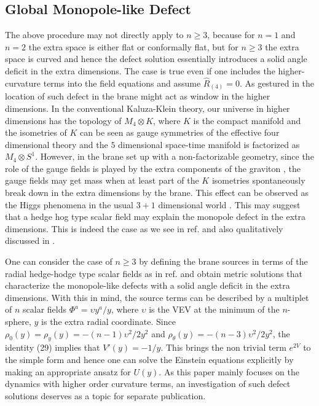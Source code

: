 \documentclass[a4paper,12pt]{article}
\begin{document}
\subsection{Global Monopole-like Defect}
The above procedure may not directly apply to $n\geq 3$, because for $n=1$ 
and $n=2$ the extra space is either flat or conformally flat, but for $n\geq 
3$ the extra space is curved and hence the defect solution essentially 
introduces a solid angle deficit in the extra dimensions. The case is true 
even if one includes the higher-curvature terms 
into the field equations and assume $\hat{R}_{(4)}=0$. As gestured in 
\cite{DVA} the location of such defect in the brane might act as window 
in the higher dimensions. In the conventional Kaluza-Klein theory, our 
universe in higher dimensions has the topology of $M_4\otimes K$, where $K$ 
is the compact manifold and the isometries of $K$ can be seen as gauge 
symmetries of the effective four dimensional theory \cite{YMC} and
the $5$ dimensional space-time manifold is factorized as $M_4\otimes S^1$.
However, in the brane set up with a non-factorizable geometry, since the role 
of the gauge fields is played by the extra components of the graviton 
\cite{NAH}, the gauge fields may get mass when at least part of 
the $K$ isometries spontaneously break down in the extra dimensions by 
the brane. This effect can be observed as the Higgs phenomena 
in the usual $3+1$ dimensional world \cite{DVA}. This may suggest that a 
hedge hog type scalar field may explain the monopole defect in 
the extra dimensions. This is indeed the case as we see in ref.\cite{IAV} 
and also qualitatively discussed in \cite{DVA}.

One can consider the case of $n\geq3$ by defining the brane 
sources in terms of the radial hedge-hodge type scalar fields as in 
ref.\cite{IAV} and obtain metric solutions that characterize the monopole-like 
defects with a solid angle deficit in the extra dimensions. 
With this in mind, the source terms can be described by a multiplet of 
$n$ scalar fields $\Phi^a=\upsilon y^a/y$, 
where $\upsilon$ is the VEV at the minimum of the $n$-sphere, $y$ is the 
extra radial coordinate. Since $\rho_0(y)=\rho_y(y)=-(n-1)\upsilon^2/{2y^2}$ 
and $\rho_{\theta}(y)=-(n-3)\upsilon^2/{2y^2}$, the identity (29) 
implies that $V'(y)= -1/y$. This brings the non trivial term $e^{2V}$ to the 
simple form and hence one can solve the Einstein equations explicitly by 
making an appropriate ansatz for $U(y)$. As this paper mainly focuses on 
the dynamics with higher order curvature terms, an investigation of such 
defect solutions deserves as a topic for separate publication.
\nopagebreak 
\end{document}
